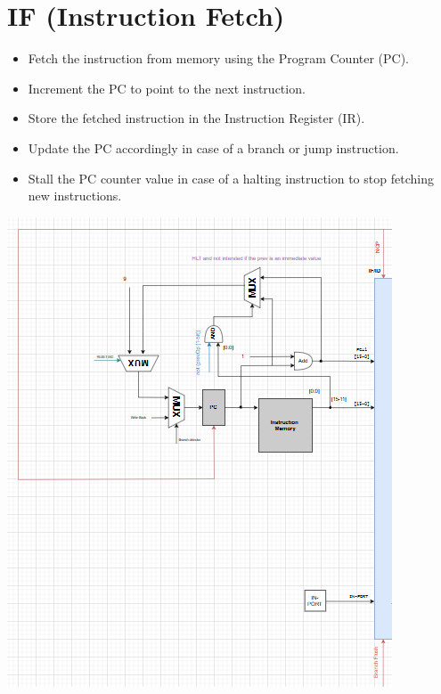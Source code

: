 \documentclass{report}
\begin{document}
\section*{IF (Instruction Fetch)}
\begin{minipage}{0.6\textwidth}
\begin{itemize}
    \item Fetch the instruction from memory using the Program Counter (PC).
    \item Increment the PC to point to the next instruction.
    \item Store the fetched instruction in the Instruction Register (IR).
    \item Update the PC accordingly in case of a branch or jump instruction.
    \item Stall the PC counter value in case of a halting instruction to stop fetching new instructions.
\end{itemize}
\end{minipage}
\hspace{1cm}
\begin{minipage}{0.35\textwidth}
\begin{center}
    \includegraphics[width=\textwidth]{./assets/IF.png}
\end{center}
\end{minipage}
\end{document}
